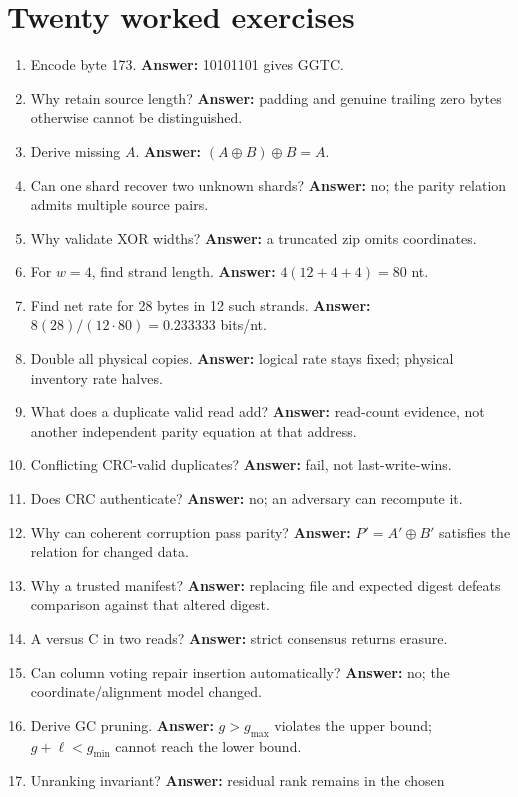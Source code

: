 \section{Twenty worked exercises}
\begin{enumerate}
\item Encode byte 173. \textbf{Answer:} 10101101 gives GGTC.
\item Why retain source length? \textbf{Answer:} padding and genuine trailing
zero bytes otherwise cannot be distinguished.
\item Derive missing $A$. \textbf{Answer:} $(A\oplus B)\oplus B=A$.
\item Can one shard recover two unknown shards? \textbf{Answer:} no;
the parity relation admits multiple source pairs.
\item Why validate XOR widths? \textbf{Answer:} a truncated zip omits coordinates.
\item For $w=4$, find strand length. \textbf{Answer:} $4(12+4+4)=80$ nt.
\item Find net rate for 28 bytes in 12 such strands. \textbf{Answer:}
$8(28)/(12\cdot80)=0.233333$ bits/nt.
\item Double all physical copies. \textbf{Answer:} logical rate stays fixed;
physical inventory rate halves.
\item What does a duplicate valid read add? \textbf{Answer:} read-count evidence,
not another independent parity equation at that address.
\item Conflicting CRC-valid duplicates? \textbf{Answer:} fail, not last-write-wins.
\item Does CRC authenticate? \textbf{Answer:} no; an adversary can recompute it.
\item Why can coherent corruption pass parity? \textbf{Answer:}
$P'=A'\oplus B'$ satisfies the relation for changed data.
\item Why a trusted manifest? \textbf{Answer:} replacing file and expected
digest defeats comparison against that altered digest.
\item A versus C in two reads? \textbf{Answer:} strict consensus returns erasure.
\item Can column voting repair insertion automatically? \textbf{Answer:} no;
the coordinate/alignment model changed.
\item Derive GC pruning. \textbf{Answer:} $g>g_{\max}$ violates the upper bound;
$g+\ell<g_{\min}$ cannot reach the lower bound.
\item Unranking invariant? \textbf{Answer:} residual rank remains in the chosen

\end{enumerate}
